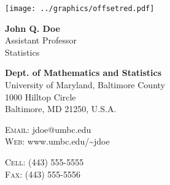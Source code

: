 \documentclass[11pt,a4paper]{memoir}
\begin{document}
\begin{center}
\texttt{[image: ../graphics/offsetred.pdf]}
\end{center}

\vspace{1em}

\begin{Spacing}{1.00}
\noindent
\tiny
\hspace{2.7mm}
\begin{minipage}[t]{0.42\textwidth}
\textbf{John Q. Doe} \\
Assistant Professor \\
Statistics
\end{minipage}
%
\begin{minipage}[t]{0.55\textwidth}
\textbf{Dept. of Mathematics and Statistics} \\
University of Maryland, Baltimore County \\
1000 Hilltop Circle \\
Baltimore, MD 21250, U.S.A.
\end{minipage}

\vspace{1em}

\noindent
\tiny
\hspace{2.7mm}
\begin{minipage}[t]{0.42\textwidth}
\textsc{Email:} jdoe@umbc.edu \\
\textsc{Web:} www.umbc.edu/{\textasciitilde}jdoe
\end{minipage}
%
\begin{minipage}[t]{0.55\textwidth}
\textsc{Cell:} (443) 555-5555 \\
\textsc{Fax:} (443) 555-5556
\end{minipage}

\end{Spacing}
\end{document}
